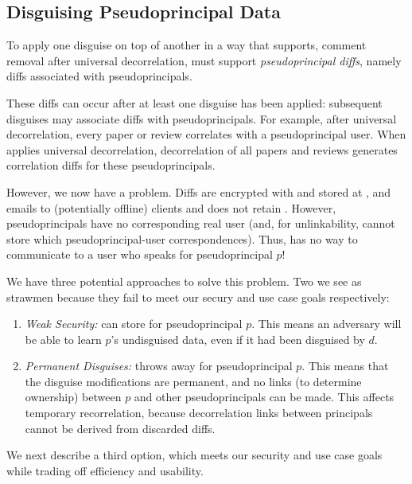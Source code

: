 \subsection{Disguising Pseudoprincipal Data}

To apply one disguise on top of another in a way that supports, \eg comment removal after universal
decorrelation, \sys must support \emph{pseudoprincipal diffs}, namely diffs associated with
pseudoprincipals. 

These diffs can occur after at least one disguise has been applied: subsequent disguises may
associate diffs with pseudoprincipals. For example, after universal decorrelation, every paper or
review correlates with a pseudoprincipal user. When \sys applies universal decorrelation,
decorrelation of all papers and reviews generates correlation diffs for these pseudoprincipals.

However, we now have a problem. Diffs are encrypted with  and stored at
, and \sys emails  to (potentially offline) clients and does not retain
.  However, pseudoprincipals have no corresponding real user (and, for unlinkability, \sys
cannot store which pseudoprincipal-user correspondences). Thus, \sys has no way to communicate
 to a user who speaks for pseudoprincipal $p$!

We have three potential approaches to solve this problem. Two we see as strawmen because they fail
to meet our secury and use case goals respectively:
\begin{enumerate}
    \item \emph{Weak Security:} \sys can store  for pseudoprincipal $p$. This means
        an adversary will be able to learn $p$'s undisguised data, even if it had been disguised by
        $d$.

    \item \emph{Permanent Disguises:} \sys throws away  for pseudoprincipal $p$. This means that the
        disguise modifications are permanent, and no links (to determine ownership) between
        $p$ and other pseudoprincipals can be made. This affects temporary recorrelation, because
        decorrelation links between principals cannot be derived from discarded diffs.
\end{enumerate}

We next describe a third option, which meets our security and use case goals while trading off
efficiency and usability.

